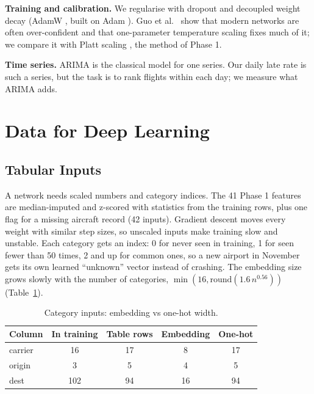 \documentclass[conference]{IEEEtran}
\begin{document}
\textbf{Training and calibration.} We regularise with dropout \cite{srivastava2014} and decoupled weight decay (AdamW \cite{loshchilov2019}, built on Adam \cite{kingma2015}). Guo et al.\ \cite{guo2017} show that modern networks are often over-confident and that one-parameter temperature scaling fixes much of it; we compare it with Platt scaling \cite{platt1999}, the method of Phase 1.

\textbf{Time series.} ARIMA \cite{box2015} is the classical model for one series. Our daily late rate is such a series, but the task is to rank flights within each day; we measure what ARIMA adds.

\section{Data for Deep Learning}
\subsection{Tabular Inputs}
A network needs scaled numbers and category indices. The 41 Phase 1 features are median-imputed and z-scored with statistics from the training rows, plus one flag for a missing aircraft record (42 inputs). Gradient descent moves every weight with similar step sizes, so unscaled inputs make training slow and unstable. Each category gets an index: 0 for never seen in training, 1 for seen fewer than 50 times, 2 and up for common ones, so a new airport in November gets its own learned ``unknown'' vector instead of crashing. The embedding size grows slowly with the number of categories, $\min(16, \mathrm{round}(1.6\,n^{0.56}))$ (Table~\ref{tab:inputs}).

\begin{table}[t]\centering\caption{Category inputs: embedding vs one-hot width.}\label{tab:inputs}
\footnotesize\begin{tabular}{lcccc}\toprule
Column & In training & Table rows & Embedding & One-hot\\\midrule
carrier & 16 & 17 & 8 & 17\\
origin & 3 & 5 & 4 & 5\\
dest & 102 & 94 & 16 & 94\\
\bottomrule\end{tabular}\end{table}
\end{document}
